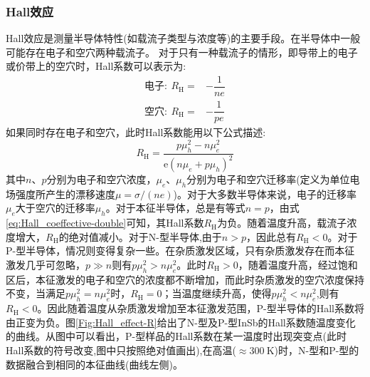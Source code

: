 \subsubsection{Hall效应} 
Hall效应是测量半导体特性(如载流子类型与浓度等)的主要手段。在半导体中一般可能存在电子和空穴两种载流子。%
对于只有一种载流子的情形，即导带上的电子或价带上的空穴时，Hall系数可以表示为:
\begin{equation}
	\begin{aligned}
		\mbox{电子}:~R_{\mathrm{H}}=&-\dfrac1{ne}\\
		\mbox{空穴}:~R_{\mathrm{H}}=&-\dfrac1{pe}
	\end{aligned}
	\label{eq:Hall_coeffective}
\end{equation}
如果同时存在电子和空穴，此时Hall系数能用以下公式描述:%
\begin{equation}
	R_{\mathrm{H}}=\dfrac{p\mu_h^2-n\mu_e^2}{\mathrm{e}(n\mu_e+p\mu_h)^2}
	\label{eq:Hall_coeffective-double}
\end{equation}
其中$n$、$p$分别为电子和空穴浓度，$\mu_e$、$\mu_h$分别为电子和空穴迁移率(定义为单位电场强度所产生的漂移速度$\mu=\sigma/(ne)$)。对于大多数半导体来说，电子的迁移率$\mu_e$大于空穴的迁移率$\mu_h$。对于本征半导体，总是有等式$n=p$，由式\eqref{eq:Hall_coeffective-double}可知，其Hall系数$R_{\mathrm{H}}$为负。随着温度升高，载流子浓度增大，$R_{\mathrm{H}}$的绝对值减小。对于N-型半导体,由于$n>p$，因此总有$R_{\mathrm{H}}<0$。对于P-型半导体，情况则变得复杂一些。在杂质激发区域，只有杂质激发存在而本征激发几乎可忽略，$p\gg n$则有$p\mu_h^2>n\mu_e^2$。此时$R_{\mathrm{H}}>0$，随着温度升高，经过饱和区后，本征激发的电子和空穴的浓度都不断增加，而此时杂质激发的空穴浓度保持不变，当满足$p\mu_h^2=n\mu_e^2$时，$R_{\mathrm{H}}=0$；当温度继续升高，使得$p\mu_h^2<n\mu_e^2$,则有$R_{\mathrm{H}}<0$。因此随着温度从杂质激发增加至本征激发范围，P-型半导体的Hall系数将由正变为负。图\ref{Fig:Hall_effect-R}给出了N-型及P-型InSb的Hall系数随温度变化的曲线。从图中可以看出，P-型样品的Hall系数在某一温度时出现突变点(此时Hall系数的符号改变,图中只按照绝对值画出),在高温($\approx300~\mathrm{K}$)时，N-型和P-型的数据融合到相同的本征曲线(曲线左侧)。
